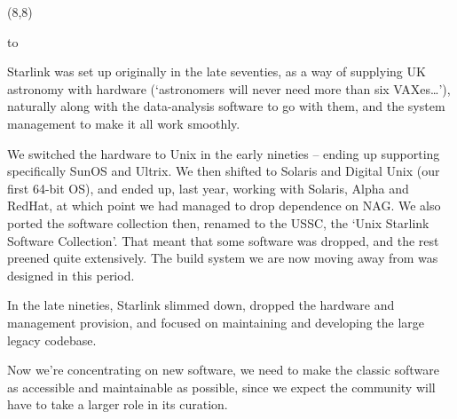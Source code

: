 \documentclass[a0,portrait]{a0poster-ng}
\def\RHead#1{\noindent\hbox to \hsize{\hfil{\LARGE\color{DarkBlue} #1\par}}\bigskip}
\let\Head\RHead
\def\RHead#1{\noindent\hbox to \hsize{\hfil{\huge\color{DarkBlue} #1\par}}\bigskip}
\let\Head\RHead
\begin{document}
\begin{textblock}{7}(8,8)

\Head{History}

Starlink was set up originally in the late seventies, as a way of
supplying UK astronomy with hardware (`astronomers will never need
more than six VAXes\dots'), naturally along with the data-analysis
software to go with them, and the system management to make it all
work smoothly.

We switched the hardware to Unix in the early nineties -- ending up
supporting specifically SunOS and Ultrix.  We then shifted to Solaris
and Digital Unix (our first 64-bit OS), and ended up, last year,
working with Solaris, Alpha and RedHat, at which point we had managed
to drop dependence on NAG.  We also ported the software
collection then, renamed to the USSC, the `Unix Starlink Software
Collection'.  That meant that some software was dropped, and the rest
preened quite extensively.  The build system we are now moving away
from was designed in this period.

In the late nineties, Starlink slimmed down, dropped the hardware and
management provision, and focused on maintaining and developing the
large legacy codebase.

Now we're concentrating on new software, we need to make the classic
software as accessible and maintainable as possible, since we expect
the community will have to take a larger role in its curation.

\end{textblock}
\end{document}
